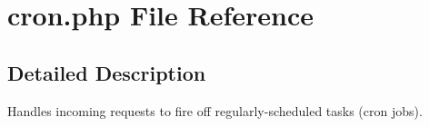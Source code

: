 \hypertarget{cron_8php}{
\section{cron.php File Reference}
\label{cron_8php}
}


\subsection{Detailed Description}
Handles incoming requests to fire off regularly-scheduled tasks (cron jobs). 